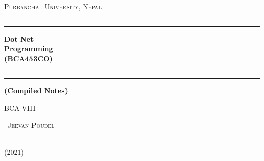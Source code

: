 \thispagestyle{empty}
\begin{titlepage}

	\centering
	{\scshape\LARGE Purbanchal University, Nepal \par}
	\vspace{0.5cm}
	\vspace*{\baselineskip} %
	
	\rule{\textwidth}{1.6pt}\vspace*{-\baselineskip}\vspace*{2pt} %
	\rule{\textwidth}{0.4pt} %
	
	\vspace{0.75\baselineskip} %
	
	{\Huge\bfseries Dot Net \\ Programming \\(BCA453CO)\\}
	
	\vspace{0.75\baselineskip} %
	
	\rule{\textwidth}{0.4pt}\vspace*{-\baselineskip}\vspace{3.2pt} %
	\rule{\textwidth}{1.6pt} %
	
	\vspace{2\baselineskip} %
	
	{\normalsize \bfseries (Compiled Notes)}
	
	\vspace{2cm}
	
	{\Large\scshape BCA-VIII \par}
	
	
	\vfill
	
	{\Huge\scshape ~{Jeevan Poudel}\par}
	
	
	\vfill
	
\vspace{0.3\baselineskip} 
{\large ~{\vspace*{0.1cm} \\(2021)} \par} 


\end{titlepage}
